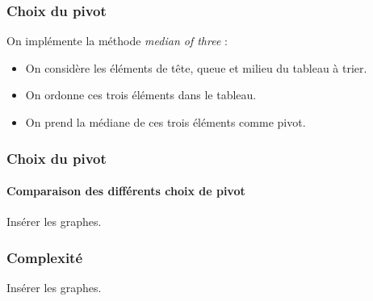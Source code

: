 \documentclass{beamer}
\begin{document}
			\begin{frame}
				\frametitle{Choix du pivot}

				On implémente la méthode \emph{median of three} : 
				
				\begin{itemize}
					\item On considère les éléments de tête, queue et
						milieu du tableau à trier.
					\item On ordonne ces trois éléments dans le tableau.
					\item On prend la médiane de ces trois éléments comme
						pivot.
				\end{itemize}

			\end{frame}
			\begin{frame}
				\frametitle{Choix du pivot}
				\framesubtitle{Comparaison des différents choix de pivot}

				Insérer les graphes.

			\end{frame}
			\begin{frame}
				\frametitle{Complexité}

				Insérer les graphes.

			\end{frame}
\end{document}
